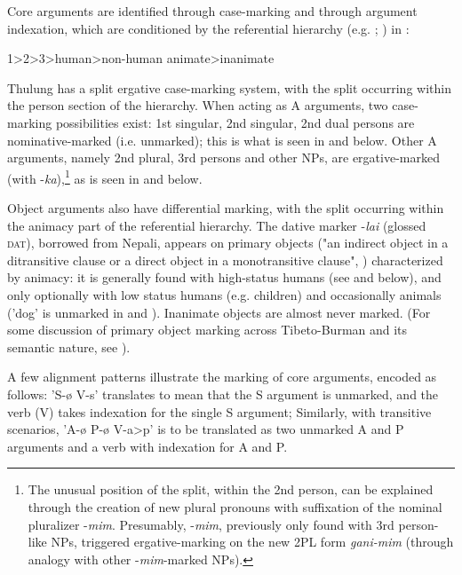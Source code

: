 \documentclass[output=paper]{langscibook}
\begin{document}
Core arguments are identified through case-marking and through argument indexation, which are conditioned by the referential hierarchy (e.g. \citealt{Silverstein1976}; \citealt{DeLancey1981}) in :

\ea%
    \label{ex:Lahaussois:1}
    1>2>3>human>non-human animate>inanimate
    \z

           

  Thulung has a split ergative case-marking system, with the split occurring within the person section of the hierarchy. When acting as A arguments, two case-marking possibilities exist: 1st singular, 2nd singular, 2nd dual persons are nominative-marked (i.e. unmarked); this is what is seen in  and  below. Other A arguments, namely 2nd plural, 3rd persons and other NPs, are ergative-marked (with -\textit{ka}),\footnote{The unusual position of the split, within the 2nd person, can be explained through the creation of new plural pronouns with suffixation of the nominal pluralizer -\textit{mim}.  Presumably, -\textit{mim}, previously only found with 3rd person-like NPs, triggered ergative-marking on the new 2\textsc{PL} form \textit{gani-mim} (through analogy with other -\textit{mim}{}-marked NPs).}  as is seen in  and  below. 

  Object arguments also have differential marking, with the split occurring within the animacy part of the referential hierarchy. The dative marker -\textit{lai} (glossed \textsc{dat}), borrowed from Nepali, appears on primary objects ("an indirect object in a ditransitive clause or a direct object in a monotransitive clause", \citealt[808]{Dryer1986}) characterized by animacy: it is generally found with high-status humans (see  and  below), and only optionally with low status humans (e.g. children) and occasionally animals ('dog' is unmarked in  and ).  Inanimate objects are almost never marked. (For some discussion of primary object marking across Tibeto-Burman and its semantic nature, see \citealt{LaPolla1992}).

  A few alignment patterns illustrate the marking of core arguments, encoded as follows: 'S-ø V-s' translates to mean that the S argument is unmarked, and the verb (V) takes indexation for the single S argument; Similarly, with transitive scenarios, 'A-ø P-ø V-a>p' is to be translated as two unmarked A and P arguments and a verb with indexation for A and P.
\end{document}
